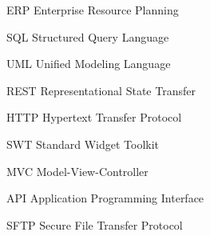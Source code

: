 \begin{siglas}
  \item[ERP] Enterprise Resource Planning
  \item[SQL] Structured Query Language
  \item[UML] Unified Modeling Language
  \item[REST] Representational State Transfer
  \item[HTTP] Hypertext Transfer Protocol
  \item[SWT] Standard Widget Toolkit
  \item[MVC] Model-View-Controller
  \item[API] Application Programming Interface
  \item[SFTP] Secure File Transfer Protocol
\end{siglas}


\tableofcontents*
\cleardoublepage

